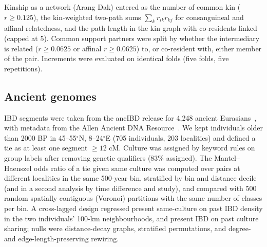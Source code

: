 \documentclass[11pt]{article}
\begin{document}
Kinship as a network (Arang Dak) entered as the number of common kin ($r\ge0.125$), the kin-weighted
two-path sums $\sum_k r_{ik}r_{kj}$ for consanguineal and affinal relatedness, and the path length in
the kin graph with co-residents linked (capped at 5). Common support partners were split by whether the
intermediary is related ($r\ge0.0625$ or affinal $r\ge0.0625$) to, or co-resident with, either member of
the pair. Increments were evaluated on identical folds (five folds, five repetitions).

\subsection{Ancient genomes}
IBD segments were taken from the ancIBD release for 4,248 ancient Eurasians~\cite{Ringbauer2024,ancIBDData}, with
metadata from the Allen Ancient DNA Resource~\cite{Mallick2024,AADRData}. We kept individuals older than 2000 BP
in 45--55$^\circ$N, 8--24$^\circ$E (705 individuals, 203 localities) and defined a tie as at least one
segment $\ge12$ cM. Culture was assigned by keyword rules on group labels after removing genetic
qualifiers (83\% assigned). The Mantel--Haenszel odds ratio of a tie given same culture was computed over
pairs at different localities in the same 500-year bin, stratified by bin and distance decile (and in a
second analysis by time difference and study), and compared with 500 random spatially contiguous
(Voronoi) partitions with the same number of classes per bin. A cross-lagged design regressed present
same-culture on past IBD density in the two individuals' 100-km neighbourhoods, and present IBD on past
culture sharing; nulls were distance-decay graphs, stratified permutations, and degree- and
edge-length-preserving rewiring.
\end{document}
